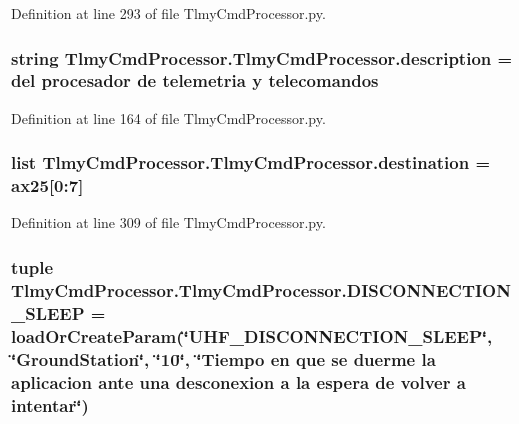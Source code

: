Definition at line 293 of file Tlmy\+Cmd\+Processor.\+py.

\hypertarget{namespace_tlmy_cmd_processor_1_1_tlmy_cmd_processor_af826240cd995d7339c5f281ee8941333}{}
\subsubsection[{description}]{\setlength{\rightskip}{0pt plus 5cm}string Tlmy\+Cmd\+Processor.\+Tlmy\+Cmd\+Processor.\+description =  del procesador de telemetria y telecomandos\textquotesingle{}}\label{namespace_tlmy_cmd_processor_1_1_tlmy_cmd_processor_af826240cd995d7339c5f281ee8941333}


Definition at line 164 of file Tlmy\+Cmd\+Processor.\+py.

\hypertarget{namespace_tlmy_cmd_processor_1_1_tlmy_cmd_processor_ad286354f2554a3e3f558866493900c47}{}
\subsubsection[{destination}]{\setlength{\rightskip}{0pt plus 5cm}list Tlmy\+Cmd\+Processor.\+Tlmy\+Cmd\+Processor.\+destination = {\bf ax25}\mbox{[}0\+:7\mbox{]}}\label{namespace_tlmy_cmd_processor_1_1_tlmy_cmd_processor_ad286354f2554a3e3f558866493900c47}


Definition at line 309 of file Tlmy\+Cmd\+Processor.\+py.

\hypertarget{namespace_tlmy_cmd_processor_1_1_tlmy_cmd_processor_a053a883aeff5a224089cd5c791e2bc4c}{}
\subsubsection[{D\+I\+S\+C\+O\+N\+N\+E\+C\+T\+I\+O\+N\+\_\+\+S\+L\+E\+E\+P}]{\setlength{\rightskip}{0pt plus 5cm}tuple Tlmy\+Cmd\+Processor.\+Tlmy\+Cmd\+Processor.\+D\+I\+S\+C\+O\+N\+N\+E\+C\+T\+I\+O\+N\+\_\+\+S\+L\+E\+E\+P = load\+Or\+Create\+Param(\char`\"{}U\+H\+F\+\_\+\+D\+I\+S\+C\+O\+N\+N\+E\+C\+T\+I\+O\+N\+\_\+\+S\+L\+E\+E\+P\char`\"{}, \char`\"{}Ground\+Station\char`\"{}, \char`\"{}10\char`\"{}, \char`\"{}Tiempo en que se duerme la aplicacion ante una desconexion {\bf a} la espera de volver {\bf a} intentar\char`\"{})}\label{namespace_tlmy_cmd_processor_1_1_tlmy_cmd_processor_a053a883aeff5a224089cd5c791e2bc4c}


